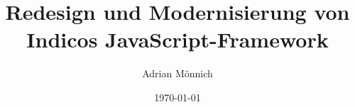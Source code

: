 \titlehead{{\Large Hochschule Karlsruhe
\hfill SS2011\\}
Fakultät für Informatik\\
Moltkestrasse 30\\
76133 Karlsruhe}
\subject{Bachelor-Thesis}
\title{Redesign und Modernisierung von Indicos JavaScript-Framework}
\author{Adrian Mönnich}
\date{\today}
\publishers{Prof. Gremminger\\
Prof. Dr. rer. pol. Philipp}

\maketitle

\tableofcontents
